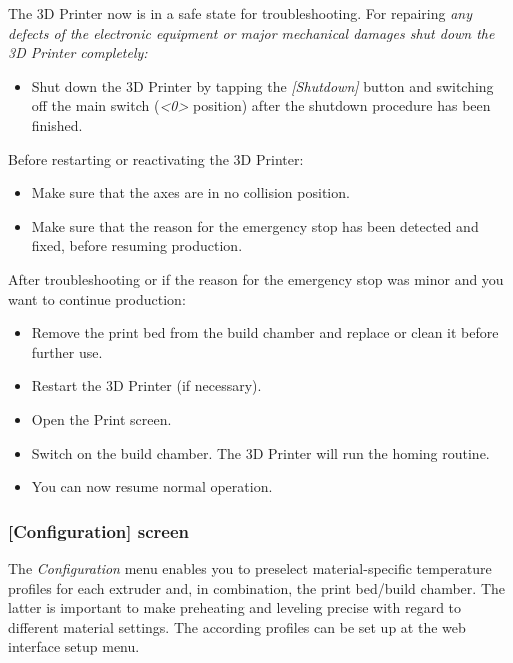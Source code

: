 The 3D Printer now is in a safe state for troubleshooting.
For repairing \emph{any defects of the electronic equipment or major mechanical damages shut down the 3D Printer completely:}

\begin{itemize}
  \item Shut down the 3D Printer by tapping the \emph{[Shutdown]} button and switching
        off the main switch (\emph{<0>} position) after the shutdown procedure has been finished.
\end{itemize}

\begin{notice}
   Before restarting or reactivating the 3D Printer:
   \begin{itemize}
     \item Make sure that the axes are in no collision position.
     \item Make sure that the reason for the emergency stop has been detected and 
           fixed, before resuming production.
   \end{itemize}
\end{notice}

 After troubleshooting or if the reason for the emergency stop was minor and you want to continue production:

\begin{itemize}
  \item Remove the print bed from the build chamber and replace or clean it before 
        further use.
  \item Restart the 3D Printer (if necessary).
  \item Open the Print screen.
  \item Switch on the build chamber. The 3D Printer will run the homing routine.
  \item You can now resume normal operation.
\end{itemize}


\subsubsection{[Configuration] screen}

 The \emph{Configuration} menu enables you to preselect material-specific temperature profiles for each extruder and, in combination, the print bed/build chamber. The latter is important to make preheating and leveling precise with regard to different material settings. The according profiles can be set up at the web interface setup menu.

